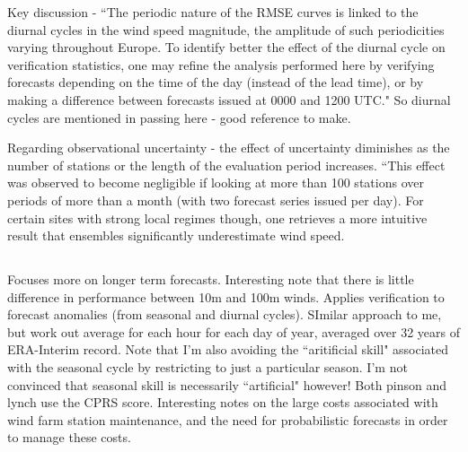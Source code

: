\documentclass{article}
\begin{document}
Key discussion - ``The periodic nature of the RMSE curves is linked to the diurnal cycles in the wind speed magnitude, the amplitude of such periodicities varying throughout Europe. To identify better the effect of the diurnal cycle on verification statistics, one may refine the analysis performed here by verifying forecasts depending on the time of the day (instead of the lead time), or by making a difference between forecasts issued at 0000 and 1200 UTC." So diurnal cycles are mentioned in passing here - good reference to make.  

Regarding observational uncertainty - the effect of uncertainty diminishes as the number of stations or the length of the evaluation period increases. ``This effect was observed to become negligible if looking at more than 100 stations over periods of more than a month (with two forecast series issued per day). For certain sites with strong local regimes though, one retrieves a more intuitive result that ensembles significantly underestimate wind speed.  

\subsection{\citet{lynch14}}
Focuses more on longer term forecasts. Interesting note that there is little difference in performance between 10m and 100m winds. Applies verification to forecast anomalies (from seasonal and diurnal cycles). SImilar approach to me, but work out average for each hour for each day of year, averaged over 32 years of ERA-Interim record. Note that I'm also avoiding the ``aritificial skill" associated with the seasonal cycle by restricting to just a particular season. I'm not convinced that seasonal skill is necessarily ``artificial" however! Both pinson and lynch use the CPRS score. Interesting notes on the large costs associated with wind farm station maintenance, and the need for probabilistic forecasts in order to manage these costs. 
\end{document}
